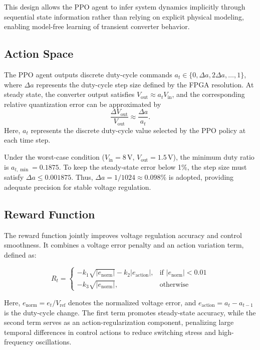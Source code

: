 \documentclass[conference]{IEEEtran}
\begin{document}
This design allows the PPO agent to infer system dynamics implicitly through sequential state information rather than relying on explicit physical modeling, enabling model-free learning of transient converter behavior.

\subsection{Action Space}
The PPO agent outputs discrete duty-cycle commands $a_t\!\in\!\{0,\Delta a,2\Delta a,\ldots,1\}$, 
where $\Delta a$ represents the duty-cycle step size defined by the FPGA resolution. 
At steady state, the converter output satisfies $V_{\text{out}}\!\approx\!a_tV_{\text{in}}$, 
and the corresponding relative quantization error can be approximated by
\begin{equation}
\frac{\Delta V_{\text{out}}}{V_{\text{out}}}\!\approx\!\frac{\Delta a}{a_t}.
\end{equation}
Here, $a_t$ represents the discrete duty-cycle value selected by the PPO policy at each time step. 

Under the worst-case condition ($V_{\text{in}}=8$\,V, $V_{\text{out}}=1.5$\,V), the minimum duty ratio is $a_{t,\min} = 0.1875$. 
To keep the steady-state error below 1\%, the step size must satisfy $\Delta a\!\le\!0.001875$. 
Thus, $\Delta a=1/1024\!\approx\!0.098\%$ is adopted, providing adequate precision for stable voltage regulation.


\subsection{Reward Function}
The reward function jointly improves voltage regulation accuracy and control smoothness. It combines a voltage error penalty and an action variation term, defined as:

\begin{equation}
R_t =
\begin{cases}
-k_1 \sqrt{\left| e_{\text{norm}} \right|} - k_2 \left| e_{\text{action}} \right|, & \text{if } \left| e_{\text{norm}} \right| < 0.01 \\[6pt]
-k_3 \sqrt{\left| e_{\text{norm}} \right|}, & \text{otherwise}
\end{cases}
\label{eq:reward}
\end{equation}

Here, $e_{\text{norm}} = e_t / V_{\text{ref}}$ denotes the normalized voltage error, and $e_{\text{action}} = a_t - a_{t-1}$ is the duty-cycle change. The first term promotes steady-state accuracy, while the second term serves as an action-regularization component, penalizing large temporal differences in control actions to reduce switching stress and high-frequency oscillations. 
\end{document}
